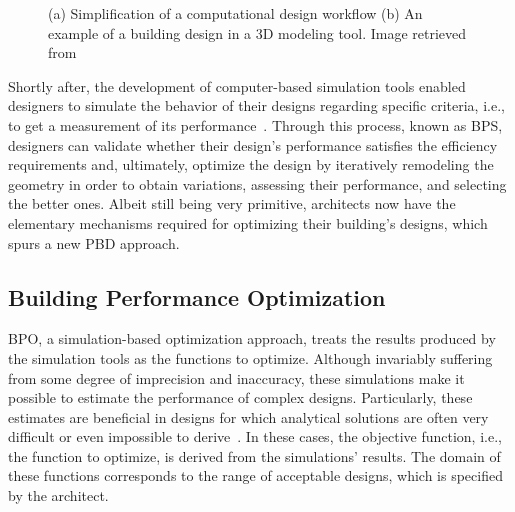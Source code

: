 \begin{figure}[htbp]
\centering
{}%
\hfill
{}%

\caption[General views of Traditional Design Approaches]{(a) Simplification of a computational design workflow (b) An example of a building design in a 3D modeling tool. Image retrieved from~\cite{3DMODELTOOL}}
\label{fig:traditionaldesign}
\end{figure}

Shortly after, the development of computer-based simulation tools enabled designers to simulate the behavior of their designs regarding specific criteria, i.e., to get a measurement of its performance~\cite{Malkawi2005}. Through this process, known as \ac{BPS}, designers can validate whether their design's performance satisfies the efficiency requirements and, ultimately, optimize the design by iteratively remodeling the geometry in order to obtain variations, assessing their performance, and selecting the better ones. Albeit still being very primitive, architects now have the elementary mechanisms required for optimizing their building's designs, which spurs a new \ac{PBD} approach.

\subsection{Building Performance Optimization}

	\ac{BPO}, a simulation-based optimization approach, treats the results produced by the simulation tools as the functions to optimize. Although invariably suffering from some degree of imprecision and inaccuracy, these simulations make it possible to estimate the performance of complex designs. Particularly, these estimates are beneficial in designs for which analytical solutions are often very difficult or even impossible to derive~\cite{Kolda2003}. In these cases, the objective function, i.e., the function to optimize, is derived from the simulations' results. The domain of these functions corresponds to the range of acceptable designs,  which is specified by the architect.

